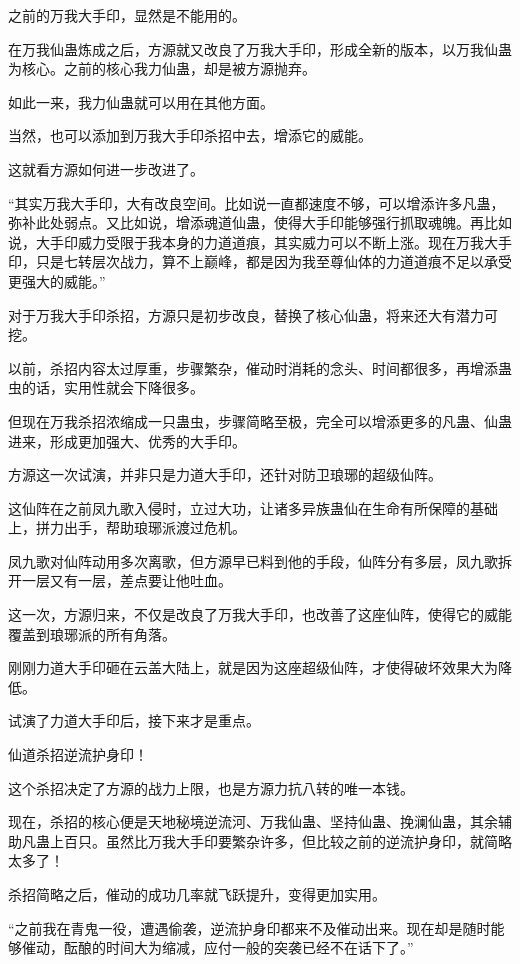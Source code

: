 \begin{this_body}
之前的万我大手印，显然是不能用的。

在万我仙蛊炼成之后，方源就又改良了万我大手印，形成全新的版本，以万我仙蛊为核心。之前的核心我力仙蛊，却是被方源抛弃。

如此一来，我力仙蛊就可以用在其他方面。

当然，也可以添加到万我大手印杀招中去，增添它的威能。

这就看方源如何进一步改进了。

“其实万我大手印，大有改良空间。比如说一直都速度不够，可以增添许多凡蛊，弥补此处弱点。又比如说，增添魂道仙蛊，使得大手印能够强行抓取魂魄。再比如说，大手印威力受限于我本身的力道道痕，其实威力可以不断上涨。现在万我大手印，只是七转层次战力，算不上巅峰，都是因为我至尊仙体的力道道痕不足以承受更强大的威能。”

对于万我大手印杀招，方源只是初步改良，替换了核心仙蛊，将来还大有潜力可挖。

以前，杀招内容太过厚重，步骤繁杂，催动时消耗的念头、时间都很多，再增添蛊虫的话，实用性就会下降很多。

但现在万我杀招浓缩成一只蛊虫，步骤简略至极，完全可以增添更多的凡蛊、仙蛊进来，形成更加强大、优秀的大手印。

方源这一次试演，并非只是力道大手印，还针对防卫琅琊的超级仙阵。

这仙阵在之前凤九歌入侵时，立过大功，让诸多异族蛊仙在生命有所保障的基础上，拼力出手，帮助琅琊派渡过危机。

凤九歌对仙阵动用多次离歌，但方源早已料到他的手段，仙阵分有多层，凤九歌拆开一层又有一层，差点要让他吐血。

这一次，方源归来，不仅是改良了万我大手印，也改善了这座仙阵，使得它的威能覆盖到琅琊派的所有角落。

刚刚力道大手印砸在云盖大陆上，就是因为这座超级仙阵，才使得破坏效果大为降低。

试演了力道大手印后，接下来才是重点。

仙道杀招逆流护身印！

这个杀招决定了方源的战力上限，也是方源力抗八转的唯一本钱。

现在，杀招的核心便是天地秘境逆流河、万我仙蛊、坚持仙蛊、挽澜仙蛊，其余辅助凡蛊上百只。虽然比万我大手印要繁杂许多，但比较之前的逆流护身印，就简略太多了！

杀招简略之后，催动的成功几率就飞跃提升，变得更加实用。

“之前我在青鬼一役，遭遇偷袭，逆流护身印都来不及催动出来。现在却是随时能够催动，酝酿的时间大为缩减，应付一般的突袭已经不在话下了。”


\end{this_body}
